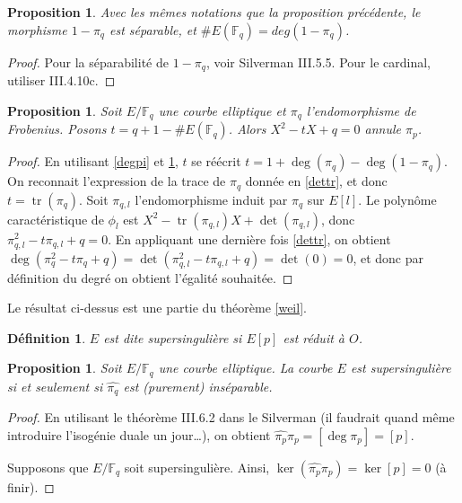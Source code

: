 \documentclass{article}
\theoremstyle{plain}%
\newtheorem{prop}[thm]{Proposition}
\newtheorem{deff}[thm]{Définition}
\theoremstyle{definition}%
\newcommand{\F}{\mathbb{F}}
\DeclareMathOperator{\tr}{tr}
\begin{document}
\begin{prop}
  \label{cardpi}
  Avec les mêmes notations que la proposition précédente, le morphisme $1-\pi_q$ est séparable, et $\#E(\F_q) = deg(1 - \pi_q)$.
\end{prop}

\begin{proof}
  Pour la séparabilité de $1-\pi_q$, voir Silverman III.5.5. Pour le cardinal, utiliser III.4.10c.
\end{proof}

\begin{prop}
  Soit $E/\F_q$ une courbe elliptique et $\pi_q$ l'endomorphisme de Frobenius. Posons $t=q+1-\#E(\F_q)$. Alors $X^2 -tX + q = 0$ annule $\pi_p$.
\end{prop}

\begin{proof}
  En utilisant \ref{degpi} et \ref{cardpi}, $t$ se réécrit $t = 1 + \deg(\pi_q) - \deg(1-\pi_q)$. On reconnait l'expression de la trace de $\pi_q$ donnée en \ref{dettr}, et donc $t = \tr(\pi_q)$. Soit $\pi_{q, l}$ l'endomorphisme induit par $\pi_q$ sur $E[l]$. Le polynôme caractéristique de $\phi_l$ est $X^2 -\tr(\pi_{q,l}) X + \det(\pi_{q, l})$, donc $\pi_{q,l}^2 - t\pi_{q,l}+q = 0$. En appliquant une dernière fois \ref{dettr}, on obtient $\deg(\pi_{q}^2 - t\pi_{q}+q ) = \det (\pi_{q,l}^2 - t\pi_{q,l}+q ) = \det(0) = 0$, et donc par définition du degré on obtient l'égalité souhaitée.
\end{proof}

Le résultat ci-dessus est une partie du théorème \ref{weil}.

\begin{deff}
  $E$ est dite supersingulière si $E[p]$ est réduit à $O$. 
\end{deff}

\begin{prop}
  \label{pihatsep}
  Soit $E/\F_q$ une courbe elliptique. La courbe $E$ est supersingulière si et seulement si $\widehat{\pi_q}$ est (purement) inséparable.
\end{prop}

\begin{proof}
   En utilisant le théorème III.6.2 dans le Silverman (il faudrait quand même introduire l'isogénie duale un jour\ldots), on obtient $\widehat{\pi_p} \pi_p = [\deg \pi_p] = [p]$.

  Supposons que $E/\F_q$ soit supersingulière. Ainsi, $\ker (\widehat{\pi_p}\pi_p) = \ker [p] = 0$ (à finir).
\end{proof}
\end{document}
